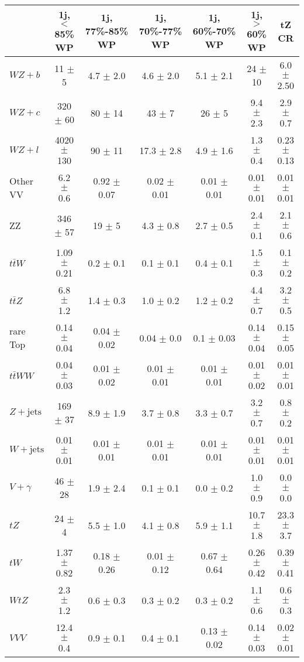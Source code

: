 \begin{tabular}{|l|c|c|c|c|c|c|}
\hline 
 & {1j, $<$85\% WP} & {1j, 77\%-85\% WP} & {1j, 70\%-77\% WP} & {1j, 60\%-70\% WP} & {1j, $>$60\% WP} & {tZ CR}\\
\hline 
  $WZ + b$   & 11 $\pm$ 5 & 4.7 $\pm$ 2.0 & 4.6 $\pm$ 2.0 & 5.1 $\pm$ 2.1 & 24 $\pm$ 10 & 6.0 $\pm$ 2.50 \\ 
  $WZ + c$   & 320 $\pm$ 60 & 80 $\pm$ 14 & 43 $\pm$ 7 & 26 $\pm$ 5 & 9.4 $\pm$ 2.3 & 2.9 $\pm$ 0.7 \\ 
  $WZ + l$   & 4020 $\pm$ 130 & 90 $\pm$ 11 & 17.3 $\pm$ 2.8 & 4.9 $\pm$ 1.6 & 1.3 $\pm$ 0.4 & 0.23 $\pm$ 0.13 \\ 
  Other VV   & 6.2 $\pm$ 0.6 & 0.92 $\pm$ 0.07 & 0.02 $\pm$ 0.01 & 0.01 $\pm$ 0.01 & 0.01 $\pm$ 0.01 & 0.01 $\pm$ 0.01 \\
  ZZ  & 346 $\pm$ 57 & 19 $\pm$ 5 & 4.3 $\pm$ 0.8 & 2.7 $\pm$ 0.5 & 2.4 $\pm$ 0.1 & 2.1 $\pm$ 0.6 \\ 
  $t\bar{t}W$   & 1.09 $\pm$ 0.21 & 0.2 $\pm$ 0.1 & 0.1 $\pm$ 0.1 & 0.4 $\pm$ 0.1 & 1.5 $\pm$ 0.3 & 0.1 $\pm$ 0.2 \\ 
  $t\bar{t}Z$   & 6.8 $\pm$ 1.2 & 1.4 $\pm$ 0.3 & 1.0 $\pm$ 0.2 & 1.2 $\pm$ 0.2 & 4.4 $\pm$ 0.7 & 3.2 $\pm$ 0.5 \\ 
  rare Top   & 0.14 $\pm$ 0.04 & 0.04 $\pm$ 0.02 & 0.04 $\pm$ 0.0 & 0.1 $\pm$ 0.03 & 0.14 $\pm$ 0.04 & 0.15 $\pm$ 0.05 \\ 
  $t\bar{t}WW$   & 0.04 $\pm$ 0.03 & 0.01 $\pm$ 0.02 & 0.01 $\pm$ 0.01 & 0.01 $\pm$ 0.01 & 0.01 $\pm$ 0.02 & 0.01 $\pm$ 0.01 \\ 
  $Z+\text{jets}$   & 169 $\pm$ 37 & 8.9 $\pm$ 1.9 & 3.7 $\pm$ 0.8 & 3.3 $\pm$ 0.7 & 3.2 $\pm$ 0.7 & 0.8 $\pm$ 0.2 \\ 
  $W+\text{jets}$   & 0.01 $\pm$ 0.01 & 0.01 $\pm$ 0.01 & 0.01 $\pm$ 0.01 & 0.01 $\pm$ 0.01 & 0.01 $\pm$ 0.01 & 0.01 $\pm$ 0.01 \\ 
  $V+\gamma$   & 46 $\pm$ 28 & 1.9 $\pm$ 2.4 & 0.1 $\pm$ 0.1 & 0.0 $\pm$ 0.2 & 1.0 $\pm$ 0.9 & 0.0 $\pm$ 0.0 \\ 
  $tZ$   & 24 $\pm$ 4 & 5.5 $\pm$ 1.0 & 4.1 $\pm$ 0.8 & 5.9 $\pm$ 1.1 & 10.7 $\pm$ 1.8 & 23.3 $\pm$ 3.7 \\ 
  $tW$   & 1.37 $\pm$ 0.82 & 0.18 $\pm$ 0.26 & 0.01 $\pm$ 0.12 & 0.67 $\pm$ 0.64 & 0.26 $\pm$ 0.42 & 0.39 $\pm$ 0.41 \\ 
  $WtZ$   & 2.3 $\pm$ 1.2 & 0.6 $\pm$ 0.3 & 0.3 $\pm$ 0.2 & 0.3 $\pm$ 0.2 & 1.1 $\pm$ 0.6 & 0.6 $\pm$ 0.3 \\ 
  $VVV$   & 12.4 $\pm$ 0.4 & 0.9 $\pm$ 0.1 & 0.4 $\pm$ 0.1 & 0.13 $\pm$ 0.02 & 0.14 $\pm$ 0.03 & 0.02 $\pm$ 0.01 \\ 

\end{tabular}
